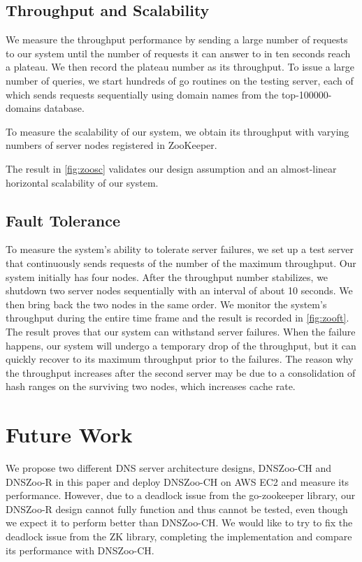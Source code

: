 \documentclass[format=sigconf,nonacm,screen]{acmart}
\newcommand{\dnszooch}{\textsf{DNSZoo-CH}}
\newcommand{\dnszoor}{\textsf{DNSZoo-R}}
\begin{document}
\subsection{Throughput and Scalability}
We measure the throughput performance by sending a large number of requests to our system until the number of requests it can answer to in ten seconds reach a plateau. We then record the plateau number as its throughput. To issue a large number of queries, we start hundreds of go routines on the testing server, each of which sends requests sequentially using domain names from the top-100000-domains database. 

To measure the scalability of our system, we obtain its throughput with varying numbers of server nodes registered in ZooKeeper.

The result in \autoref{fig:zoosc} validates our design assumption and an almost-linear horizontal scalability of our system. 

\subsection{Fault Tolerance}
To measure the system's ability to tolerate server failures, we set up a test server that continuously sends requests of the number of the maximum throughput. Our system initially has four nodes. After the throughput number stabilizes, we shutdown two server nodes sequentially with an interval of about 10 seconds. We then bring back the two nodes in the same order. We monitor the system's throughput during the entire time frame and the result is recorded in \autoref{fig:zooft}.\\
The result proves that our system can withstand server failures. When the failure happens, our system will undergo a temporary drop of the throughput, but it can quickly recover to its maximum throughput prior to the failures. The reason why the throughput increases after the second server may be due to a consolidation of hash ranges on the surviving two nodes, which increases cache rate.

\section{Future Work}
We propose two different DNS server architecture designs, \dnszooch{} and \dnszoor{} in this paper and deploy \dnszooch{} on AWS EC2 and measure its performance. However, due to a deadlock issue from the go-zookeeper library, our \dnszoor{} design cannot fully function and thus cannot be tested, even though we expect it to perform better than \dnszooch{}. We would like to try to fix the deadlock issue from the ZK library, completing the implementation and compare its performance with \dnszooch{}.
\end{document}
